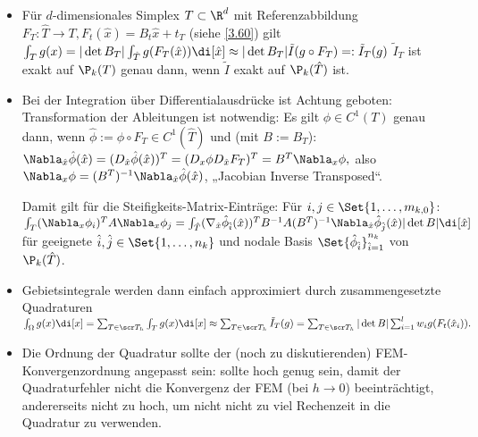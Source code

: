 \begin{note}
	\begin{itemize}
		\item
			Für $d$-dimensionales Simplex $T \subset \R^d$ mit Referenzabbildung $F_T: \hat T \to T, F_t(\hat x) = B_t \hat x + t_T$ (siehe \ref{3.60}) gilt
			\begin{math}
				\int_T g(x)
				= |\det B_T| \int_{\hat T} g(F_T(\hat x)) \di[\hat x]
				\approx |\det B_T| \tilde I(g \circ F_T)
				=: \tilde I_T(g)
			\end{math}
			$\tilde I_T$ ist exakt auf $\P_k(T)$ genau dann, wenn $\tilde I$ exakt auf $\P_k(\hat T)$ ist.
		\item
			Bei der Integration über Differentialausdrücke ist Achtung geboten:
			Transformation der Ableitungen ist notwendig:
			Es gilt $\phi \in C^1(T)$ genau dann, wenn $\hat \phi := \phi \circ F_T \in C^1(\hat T)$ und (mit $B := B_T$):
			\begin{math}
				\Nabla_{\hat x} \hat \phi(\hat x)
				= (D_{\hat x} \hat \phi(\hat x))^T
				= (D_x \phi D_{\hat x} F_T)^T
				= B^T \Nabla_x \phi,
			\end{math}
			also $\Nabla_x \phi = (B^T)^{-1} \Nabla_{\hat x} \hat \phi(\hat x)$, „Jacobian Inverse Transposed“.

			Damit gilt für die Steifigkeits-Matrix-Einträge:
			Für $i, j \in \Set{1, \dotsc, {m_{k,0}}}$:
			\begin{math}
				\int_T (\Nabla_x \phi_i)^T A \Nabla_x \phi_j
				= \int_{\hat T} (\nabla_{\hat x} \hat \phi_{\hat i}(\hat x))^T B^{-1} A (B^T)^{-1} \Nabla_{\hat x} \hat \phi_{\hat j} (\hat x) |\det B| \di[\hat x]
			\end{math}
			für geeignete $\hat i, \hat j \in \Set{1, \dotsc, n_k}$ und nodale Basis $\Set{\hat \phi_{\hat i}}_{\hat i = 1}^{n_k}$ von $\P_k(\hat T)$.
		\item
			Gebietsintegrale werden dann einfach approximiert durch zusammengesetzte Quadraturen
			\begin{math}
				\int_\Omega g(x) \di[x]
				= \sum_{T \in \scr T_h} \int_T g(x) \di[x]
				\approx \sum_{T \in \scr T_h} \tilde I_T(g)
				= \sum_{T \in \scr T_h} |\det B| \sum_{i=1}^l w_i g(F_t(\hat x_i)).
			\end{math}
		\item
			Die Ordnung der Quadratur sollte der (noch zu diskutierenden) FEM-Konvergenzordnung angepasst sein:
			sollte hoch genug sein, damit der Quadraturfehler nicht die Konvergenz der FEM (bei $h \to 0$) beeinträchtigt, andererseits nicht zu hoch, um nicht nicht zu viel Rechenzeit in die Quadratur zu verwenden.
	\end{itemize}
\end{note}

